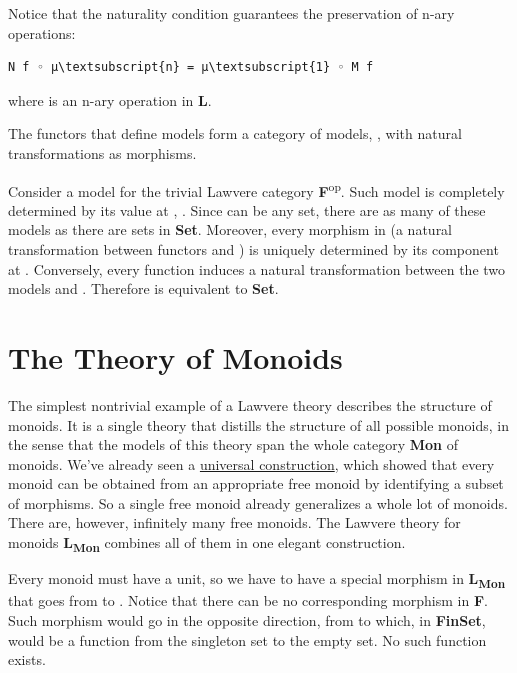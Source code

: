 Notice that the naturality condition guarantees the preservation of
n-ary operations:

\begin{Verbatim}[commandchars=\\\{\}]
N f ◦ μ\textsubscript{n} = μ\textsubscript{1} ◦ M f
\end{Verbatim}
where  is an n-ary operation in
\textbf{L}.

The functors that define models form a category of models,
, with natural transformations as morphisms.

Consider a model for the trivial Lawvere category
\textbf{F}\textsuperscript{op}. Such model is completely determined by
its value at , . Since  can be any
set, there are as many of these models as there are sets in
\textbf{Set}. Moreover, every morphism in  (a
natural transformation between functors  and ) is
uniquely determined by its component at . Conversely, every
function  induces a natural
transformation between the two models  and .
Therefore  is equivalent to \textbf{Set}.

\section{The Theory of Monoids}\label{the-theory-of-monoids}

The simplest nontrivial example of a Lawvere theory describes the
structure of monoids. It is a single theory that distills the structure
of all possible monoids, in the sense that the models of this theory
span the whole category \textbf{Mon} of monoids. We've already seen a
\hyperref[free-monoids]{universal
construction}, which showed that every monoid can be obtained from an
appropriate free monoid by identifying a subset of morphisms. So a
single free monoid already generalizes a whole lot of monoids. There
are, however, infinitely many free monoids. The Lawvere theory for
monoids \textbf{L\textsubscript{Mon}} combines all of them in one
elegant construction.

Every monoid must have a unit, so we have to have a special morphism
 in \textbf{L\textsubscript{Mon}} that goes from  to
. Notice that there can be no corresponding morphism in
\textbf{F}. Such morphism would go in the opposite direction, from
 to  which, in \textbf{FinSet}, would be a function
from the singleton set to the empty set. No such function exists.

